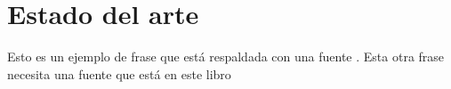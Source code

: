 \noindent %
\chapter{Estado del arte}
\noindent


Esto es un ejemplo de frase que está respaldada con una fuente \cite{england2011gender}.
Esta otra frase necesita una fuente que está en este libro %